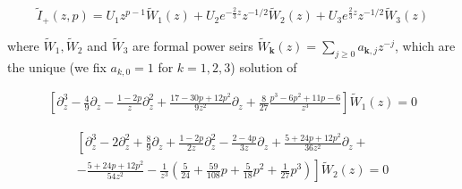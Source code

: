 \documentclass{article}
\begin{document}
%
%
%

\begin{equation}
\tilde{I}_+(z,p)=U_1z^{p-1}\tilde{W}_1(z)+U_2e^{-\tfrac{2}{3}z}z^{-1/2}\tilde{W}_2(z)+U_3e^{\tfrac{2}{3}z}z^{-1/2}\tilde{W}_3(z)
\end{equation}

where $\tilde{W}_1, \tilde{W}_2$ and $\tilde{W}_3$ are formal power seirs $\tilde{W}_{\mathbf{k}}(z)=\sum_{j\geq 0}a_{\mathbf{k},j}z^{-j}$, which are the unique (we fix $a_{k,0}=1$ for $k=1,2,3$) solution of 

\begin{multline}\label{w1}
\left[\partial_z^3-\frac{4}{9}\partial_z-\frac{1-2p}{z}\partial_z^2+\frac{17-30p+12p^2}{9z^2}\partial_z+\frac{8}{27}\frac{p^3-6p^2+11p-6}{z^3}\right]\tilde{W}_1(z)=0
\end{multline}


\begin{multline}\label{w2}
\left[\partial_z^3-2\partial_z^2+\frac{8}{9}\partial_z+\frac{1-2p}{2z}\partial_z^2-\frac{2-4p}{3z}\partial_z+\frac{5+24p+12p^2}{36z^2}\partial_z+\right.\\
\left.-\frac{5+24p+12p^2}{54z^2}-\frac{1}{z^3}\left(\frac{5}{24}+\frac{59}{108}p+\frac{5}{18}p^2+\frac{1}{27}p^3\right)\right]\tilde{W}_2(z)=0
\end{multline}
\end{document}

